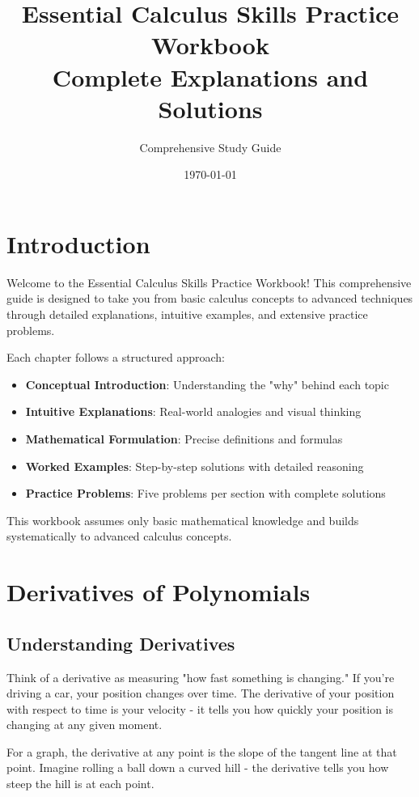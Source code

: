 \documentclass[12pt,a4paper]{book}
\title{\Huge\textbf{Essential Calculus Skills Practice Workbook}\\\Large Complete Explanations and Solutions}
\author{Comprehensive Study Guide}
\date{\today}
\theoremstyle{definition}
\begin{document}
\maketitle

\tableofcontents

\chapter*{Introduction}

Welcome to the Essential Calculus Skills Practice Workbook! This comprehensive guide is designed to take you from basic calculus concepts to advanced techniques through detailed explanations, intuitive examples, and extensive practice problems.

Each chapter follows a structured approach:
\begin{itemize}
    \item \textbf{Conceptual Introduction}: Understanding the "why" behind each topic
    \item \textbf{Intuitive Explanations}: Real-world analogies and visual thinking
    \item \textbf{Mathematical Formulation}: Precise definitions and formulas
    \item \textbf{Worked Examples}: Step-by-step solutions with detailed reasoning
    \item \textbf{Practice Problems}: Five problems per section with complete solutions
\end{itemize}

This workbook assumes only basic mathematical knowledge and builds systematically to advanced calculus concepts.

\chapter{Derivatives of Polynomials}

\section{Understanding Derivatives}

\begin{intuition}
Think of a derivative as measuring "how fast something is changing." If you're driving a car, your position changes over time. The derivative of your position with respect to time is your velocity - it tells you how quickly your position is changing at any given moment.

For a graph, the derivative at any point is the slope of the tangent line at that point. Imagine rolling a ball down a curved hill - the derivative tells you how steep the hill is at each point.
\end{intuition}
\end{document}
